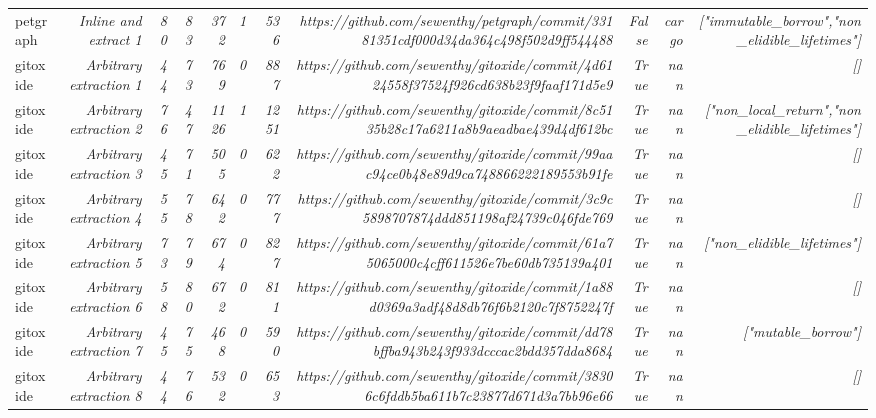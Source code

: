 \begin{landscape}
\begin{table}[]
{\begin{tabular}{lrrrrrrrrrr}
petgraph & \textit{Inline and extract 1} & \textit{80} & \textit{83} & \textit{372} & \textit{1} & \textit{536} & \textit{https://github.com/sewenthy/petgraph/commit/33181351cdf000d34da364c498f502d9ff544488} & \textit{False} & \textit{cargo} & \textit{["immutable\_borrow","non\_elidible\_lifetimes"]} \\
gitoxide & \textit{Arbitrary extraction 1} & \textit{44} & \textit{73} & \textit{769} & \textit{0} & \textit{887} & \textit{https://github.com/sewenthy/gitoxide/commit/4d6124558f37524f926cd638b23f9faaf171d5e9} & \textit{True} & \textit{nan} & \textit{[]} \\
gitoxide & \textit{Arbitrary extraction 2} & \textit{76} & \textit{47} & \textit{1126} & \textit{1} & \textit{1251} & \textit{https://github.com/sewenthy/gitoxide/commit/8c5135b28c17a6211a8b9aeadbae439d4df612bc} & \textit{True} & \textit{nan} & \textit{["non\_local\_return","non\_elidible\_lifetimes"]} \\
gitoxide & \textit{Arbitrary extraction 3} & \textit{45} & \textit{71} & \textit{505} & \textit{0} & \textit{622} & \textit{https://github.com/sewenthy/gitoxide/commit/99aac94ce0b48e89d9ca748866222189553b91fe} & \textit{True} & \textit{nan} & \textit{[]} \\
gitoxide & \textit{Arbitrary extraction 4} & \textit{55} & \textit{78} & \textit{642} & \textit{0} & \textit{777} & \textit{https://github.com/sewenthy/gitoxide/commit/3c9c5898707874ddd851198af24739c046fde769} & \textit{True} & \textit{nan} & \textit{[]} \\
gitoxide & \textit{Arbitrary extraction 5} & \textit{73} & \textit{79} & \textit{674} & \textit{0} & \textit{827} & \textit{https://github.com/sewenthy/gitoxide/commit/61a75065000c4cff611526e7be60db735139a401} & \textit{True} & \textit{nan} & \textit{["non\_elidible\_lifetimes"]} \\
gitoxide & \textit{Arbitrary extraction 6} & \textit{58} & \textit{80} & \textit{672} & \textit{0} & \textit{811} & \textit{https://github.com/sewenthy/gitoxide/commit/1a88d0369a3adf48d8db76f6b2120c7f8752247f} & \textit{True} & \textit{nan} & \textit{[]} \\
gitoxide & \textit{Arbitrary extraction 7} & \textit{45} & \textit{75} & \textit{468} & \textit{0} & \textit{590} & \textit{https://github.com/sewenthy/gitoxide/commit/dd78bffba943b243f933dcccac2bdd357dda8684} & \textit{True} & \textit{nan} & \textit{["mutable\_borrow"]} \\
gitoxide & \textit{Arbitrary extraction 8} & \textit{44} & \textit{76} & \textit{532} & \textit{0} & \textit{653} & \textit{https://github.com/sewenthy/gitoxide/commit/38306c6fddb5ba611b7c23877d671d3a7bb96e66} & \textit{True} & \textit{nan} & \textit{[]} \\

\end{tabular}}
\end{table}
\end{landscape}
